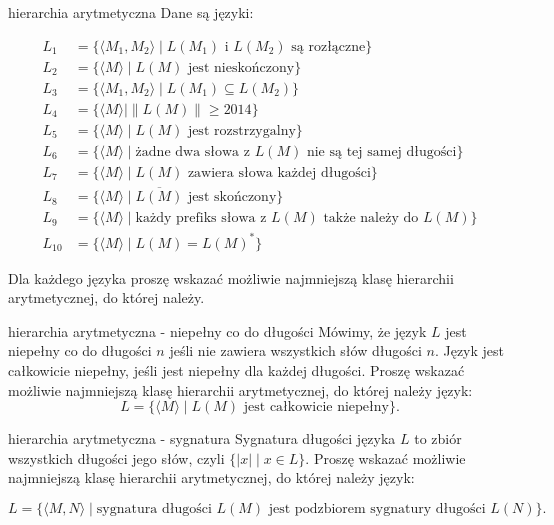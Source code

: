 \begin{exercise}{hierarchia arytmetyczna}
    Dane są języki:

\begin{align*}
L_1 &= \{\langle M_1, M_2 \rangle \mid L(M_1) \text{ i } L(M_2) \text{ są rozłączne} \} \\
L_2 &= \{\langle M \rangle \mid L(M) \text{ jest nieskończony} \} \\
L_3 &= \{\langle M_1, M_2 \rangle \mid L(M_1) \subseteq L(M_2) \} \\
L_4 &= \{\langle M \rangle \mid \|L(M)\| \geq 2014 \} \\
L_5 &= \{\langle M \rangle \mid L(M) \text{ jest rozstrzygalny} \} \\
L_6 &= \{\langle M \rangle \mid \text{żadne dwa słowa z } L(M) \text{ nie są tej samej długości} \} \\
L_7 &= \{\langle M \rangle \mid L(M) \text{ zawiera słowa każdej długości} \} \\
L_8 &= \{\langle M \rangle \mid \overline{L(M)} \text{ jest skończony} \} \\
L_9 &= \{\langle M \rangle \mid \text{każdy prefiks słowa z } L(M) \text{ także należy do } L(M) \} \\
L_{10} &= \{\langle M \rangle \mid L(M) = L(M)^* \}
\end{align*}

Dla każdego języka proszę wskazać możliwie najmniejszą klasę hierarchii arytmetycznej, do której należy.
\end{exercise}

\begin{exercise}{hierarchia arytmetyczna - niepełny co do długości}
    Mówimy, że język $L$ jest niepełny co do długości $n$ jeśli nie zawiera wszystkich słów długości $n$. Język jest całkowicie niepełny, jeśli jest niepełny dla każdej długości. Proszę wskazać możliwie najmniejszą klasę hierarchii arytmetycznej, do której należy język:
    $$L = \{\langle M \rangle \mid L(M) \text{ jest całkowicie niepełny} \}.$$
\end{exercise}


\begin{exercise}{hierarchia arytmetyczna - sygnatura}
    Sygnatura długości języka $L$ to zbiór wszystkich długości jego słów, czyli $\{|x| \mid x \in L\}$. Proszę wskazać możliwie najmniejszą klasę hierarchii arytmetycznej, do której należy język:

$$L = \{\langle M,N \rangle \mid \text{sygnatura długości } L(M) \text{ jest podzbiorem sygnatury długości } L(N) \}.$$
\end{exercise}

